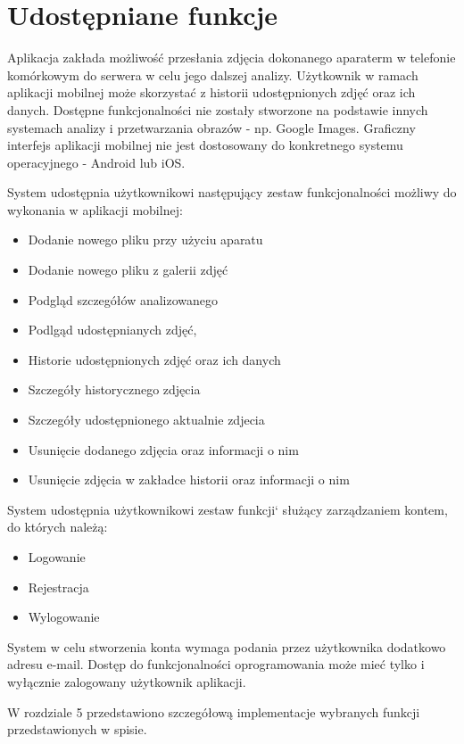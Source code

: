 \section{Udostępniane funkcje}
Aplikacja zakłada możliwość przesłania zdjęcia dokonanego aparaterm w telefonie komórkowym do serwera w celu jego dalszej analizy. Użytkownik w ramach aplikacji mobilnej może skorzystać z historii udostępnionych zdjęć oraz ich danych. Dostępne funkcjonalności nie zostały stworzone na podstawie innych systemach analizy i przetwarzania obrazów - np. Google Images. Graficzny interfejs aplikacji mobilnej nie jest dostosowany do konkretnego systemu operacyjnego - Android lub iOS. 

System udostępnia użytkownikowi następujący zestaw funkcjonalności możliwy do wykonania w aplikacji mobilnej:
\begin{itemize}[align=left]

	\item Dodanie nowego pliku przy użyciu aparatu
	\item Dodanie nowego pliku z galerii zdjęć
	\item Podgląd szczegółów analizowanego 
	\item Podlgąd udostępnianych zdjęć,
	\item Historie udostępnionych zdjęć oraz ich danych
	\item Szczegóły historycznego zdjęcia
	\item Szczegóły udostępnionego aktualnie zdjecia
	\item Usunięcie dodanego zdjęcia oraz informacji o nim
	\item Usunięcie zdjęcia w zakładce historii oraz informacji o nim
	
\end{itemize}

System udostępnia użytkownikowi zestaw funkcji`  służący zarządzaniem kontem, do których należą:
\begin{itemize}[align=left]
	\item Logowanie
	\item Rejestracja
	\item Wylogowanie	
\end{itemize}

System w celu stworzenia konta wymaga podania przez użytkownika dodatkowo adresu e-mail. Dostęp do funkcjonalności oprogramowania może mieć tylko i wyłącznie zalogowany użytkownik aplikacji. 

W rozdziale 5 przedstawiono szczegółową implementacje wybranych funkcji przedstawionych w spisie.
